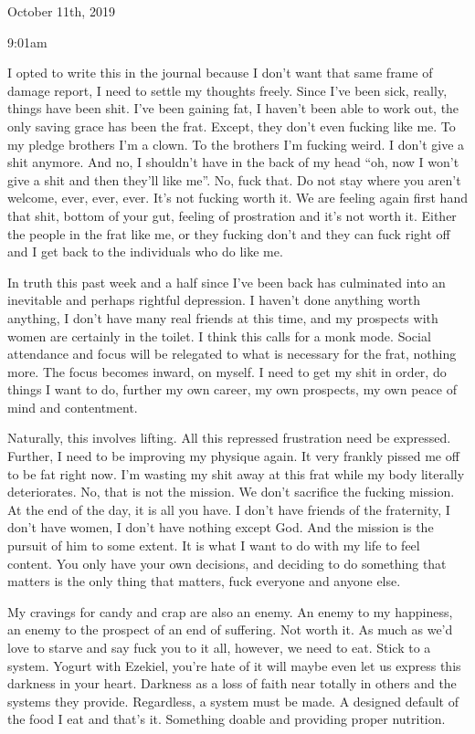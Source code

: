 \bigskip
\bigskip
October 11th, 2019

9:01am

I opted to write this in the journal because I don't want that same
frame of damage report, I need to settle my thoughts freely. Since I've
been sick, really, things have been shit. I've been gaining fat, I
haven't been able to work out, the only saving grace has been the frat.
Except, they don't even fucking like me. To my pledge brothers I'm a
clown. To the brothers I'm fucking weird. I don't give a shit anymore.
And no, I shouldn't have in the back of my head ``oh, now I won't give a
shit and then they'll like me''. No, fuck that. Do not stay where you
aren't welcome, ever, ever, ever. It's not fucking worth it. We are
feeling again first hand that shit, bottom of your gut, feeling of
prostration and it's not worth it. Either the people in the frat like
me, or they fucking don't and they can fuck right off and I get back to
the individuals who do like me.

\qquad In truth this past week and a half since I've been back has
culminated into an inevitable and perhaps rightful depression. I haven't
done anything worth anything, I don't have many real friends at this
time, and my prospects with women are certainly in the toilet. I think
this calls for a monk mode. Social attendance and focus will be
relegated to what is necessary for the frat, nothing more. The focus
becomes inward, on myself. I need to get my shit in order, do things I
want to do, further my own career, my own prospects, my own peace of
mind and contentment.

\qquad Naturally, this involves lifting. All this repressed frustration
need be expressed. Further, I need to be improving my physique again. It
very frankly pissed me off to be fat right now. I'm wasting my shit away
at this frat while my body literally deteriorates. No, that is not the
mission. We don't sacrifice the fucking mission. At the end of the day,
it is all you have. I don't have friends of the fraternity, I don't have
women, I don't have nothing except God. And the mission is the pursuit
of him to some extent. It is what I want to do with my life to feel
content. You only have your own decisions, and deciding to do something
that matters is the only thing that matters, fuck everyone and anyone
else.

\qquad My cravings for candy and crap are also an enemy. An enemy to my
happiness, an enemy to the prospect of an end of suffering. Not worth
it. As much as we'd love to starve and say fuck you to it all, however,
we need to eat. Stick to a system. Yogurt with Ezekiel, you're hate of
it will maybe even let us express this darkness in your heart. Darkness
as a loss of faith near totally in others and the systems they provide.
Regardless, a system must be made. A designed default of the food I eat
and that's it. Something doable and providing proper nutrition.

